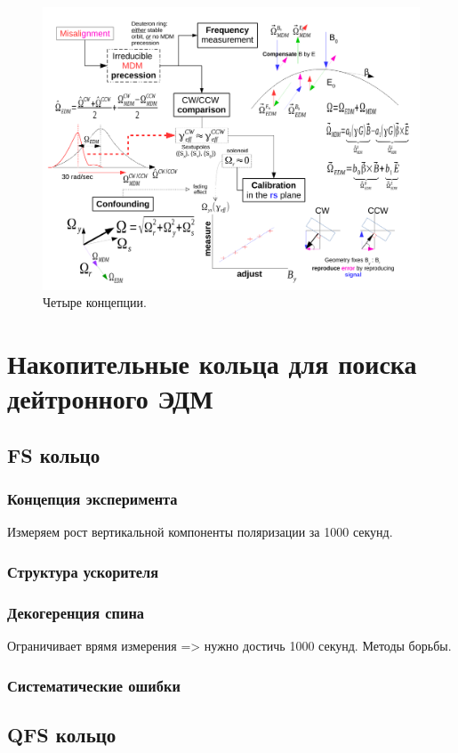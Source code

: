 \documentclass{extarticle}
\begin{document}
\begin{figure}
	\centering
	\includegraphics[scale=.6]{TheFourConcepts.pdf}
	\caption{Четыре концепции.}
\end{figure}

\section{Накопительные кольца для поиска дейтронного ЭДМ}
\subsection{FS кольцо}
	\subsubsection{Концепция эксперимента}
		Измеряем рост вертикальной компоненты поляризации за 1000 секунд.
	\subsubsection{Структура ускорителя}
	\subsubsection{Декогеренция спина}
		Ограничивает врямя измерения => нужно достичь 1000 секунд. Методы борьбы.
	\subsubsection{Систематические ошибки}
\subsection{QFS кольцо}
\end{document}
